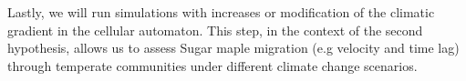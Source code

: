 
 


Lastly, we will run simulations with increases or modification of the
climatic gradient in the cellular automaton. This step, in the context of the
second hypothesis, allows us to assess Sugar maple migration (e.g velocity and
time lag) through  temperate communities under different climate change
scenarios.


\clearpage

